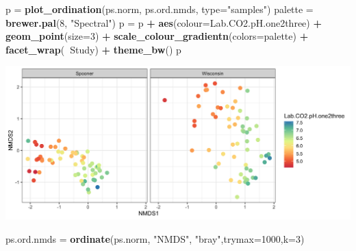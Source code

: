 \documentclass[]{article}
\newenvironment{Shaded}{\begin{snugshade}}{\end{snugshade}}
\newcommand{\DataTypeTok}[1]{\textcolor[rgb]{0.13,0.29,0.53}{#1}}
\newcommand{\DecValTok}[1]{\textcolor[rgb]{0.00,0.00,0.81}{#1}}
\newcommand{\KeywordTok}[1]{\textcolor[rgb]{0.13,0.29,0.53}{\textbf{#1}}}
\newcommand{\NormalTok}[1]{#1}
\newcommand{\OperatorTok}[1]{\textcolor[rgb]{0.81,0.36,0.00}{\textbf{#1}}}
\newcommand{\StringTok}[1]{\textcolor[rgb]{0.31,0.60,0.02}{#1}}
\begin{document}
\begin{Shaded}
\begin{Highlighting}[]
\NormalTok{p =}\StringTok{ }\KeywordTok{plot_ordination}\NormalTok{(ps.norm, ps.ord.nmds, }\DataTypeTok{type=}\StringTok{"samples"}\NormalTok{)}
\NormalTok{palette =}\StringTok{ }\KeywordTok{brewer.pal}\NormalTok{(}\DecValTok{8}\NormalTok{, }\StringTok{"Spectral"}\NormalTok{)}
\NormalTok{p =}\StringTok{ }\NormalTok{p }\OperatorTok{+}\StringTok{ }\KeywordTok{aes}\NormalTok{(}\DataTypeTok{colour=}\NormalTok{Lab.CO2.pH.one2three) }\OperatorTok{+}\StringTok{ }\KeywordTok{geom_point}\NormalTok{(}\DataTypeTok{size=}\DecValTok{3}\NormalTok{) }\OperatorTok{+}\StringTok{ }
\StringTok{  }\KeywordTok{scale_colour_gradientn}\NormalTok{(}\DataTypeTok{colors=}\NormalTok{palette) }\OperatorTok{+}\StringTok{ }\KeywordTok{facet_wrap}\NormalTok{(}\OperatorTok{~}\NormalTok{Study) }\OperatorTok{+}\StringTok{ }
\StringTok{  }\KeywordTok{theme_bw}\NormalTok{()}
\NormalTok{p}
\end{Highlighting}
\end{Shaded}

\includegraphics{output-rmd/nmds-bray-soilph-Lab.CO2.pH.one2thre-1.png}

\begin{Shaded}
\begin{Highlighting}[]
\NormalTok{ps.ord.nmds =}\StringTok{ }\KeywordTok{ordinate}\NormalTok{(ps.norm, }\StringTok{"NMDS"}\NormalTok{, }\StringTok{"bray"}\NormalTok{,}\DataTypeTok{trymax=}\DecValTok{1000}\NormalTok{,}\DataTypeTok{k=}\DecValTok{3}\NormalTok{)}
\end{Highlighting}
\end{Shaded}
\end{document}
